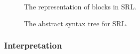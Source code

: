 \begin{figure}[H]
  
  \caption{The representation of blocks in SRL.}\label{fig:srlblock}
\end{figure}

\begin{figure}[H]
  
  \caption{The abstract syntax tree for SRL.}\label{fig:srlast}
\end{figure}

\subsubsection{Interpretation}
